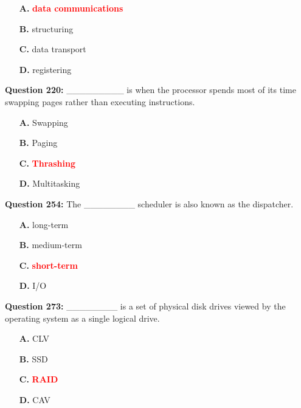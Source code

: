 \documentclass[12pt,a4paper]{article}
\begin{document}
\begin{itemize}
    \item[\textbf{A.}] \textcolor{red}{\textbf{data communications}}
    \item[\textbf{B.}] structuring
    \item[\textbf{C.}] data transport
    \item[\textbf{D.}] registering
\end{itemize}

\vspace{0.5cm}

\textbf{Question 220:} _________ is when the processor spends most of its time swapping pages rather than executing instructions.

\begin{itemize}
    \item[\textbf{A.}] Swapping
    \item[\textbf{B.}] Paging
    \item[\textbf{C.}] \textcolor{red}{\textbf{Thrashing}}
    \item[\textbf{D.}] Multitasking
\end{itemize}

\vspace{0.5cm}

\textbf{Question 254:} The ________ scheduler is also known as the dispatcher.

\begin{itemize}
    \item[\textbf{A.}] long-term
    \item[\textbf{B.}] medium-term
    \item[\textbf{C.}] \textcolor{red}{\textbf{short-term}}
    \item[\textbf{D.}] I/O
\end{itemize}

\vspace{0.5cm}

\textbf{Question 273:} ________ is a set of physical disk drives viewed by the operating system as a single logical drive.

\begin{itemize}
    \item[\textbf{A.}] CLV
    \item[\textbf{B.}] SSD
    \item[\textbf{C.}] \textcolor{red}{\textbf{RAID}}
    \item[\textbf{D.}] CAV
\end{itemize}
\end{document}
